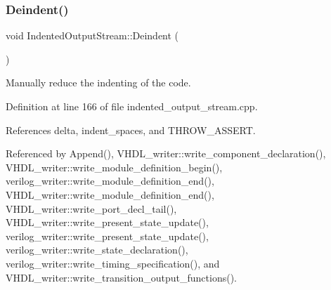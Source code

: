 \subsubsection{\texorpdfstring{Deindent()}{Deindent()}}
{\footnotesize\ttfamily void Indented\+Output\+Stream\+::\+Deindent (\begin{DoxyParamCaption}{ }\end{DoxyParamCaption})}



Manually reduce the indenting of the code. 



Definition at line 166 of file indented\+\_\+output\+\_\+stream.\+cpp.



References delta, indent\+\_\+spaces, and T\+H\+R\+O\+W\+\_\+\+A\+S\+S\+E\+RT.



Referenced by Append(), V\+H\+D\+L\+\_\+writer\+::write\+\_\+component\+\_\+declaration(), V\+H\+D\+L\+\_\+writer\+::write\+\_\+module\+\_\+definition\+\_\+begin(), verilog\+\_\+writer\+::write\+\_\+module\+\_\+definition\+\_\+end(), V\+H\+D\+L\+\_\+writer\+::write\+\_\+module\+\_\+definition\+\_\+end(), V\+H\+D\+L\+\_\+writer\+::write\+\_\+port\+\_\+decl\+\_\+tail(), V\+H\+D\+L\+\_\+writer\+::write\+\_\+present\+\_\+state\+\_\+update(), verilog\+\_\+writer\+::write\+\_\+present\+\_\+state\+\_\+update(), verilog\+\_\+writer\+::write\+\_\+state\+\_\+declaration(), verilog\+\_\+writer\+::write\+\_\+timing\+\_\+specification(), and V\+H\+D\+L\+\_\+writer\+::write\+\_\+transition\+\_\+output\+\_\+functions().

